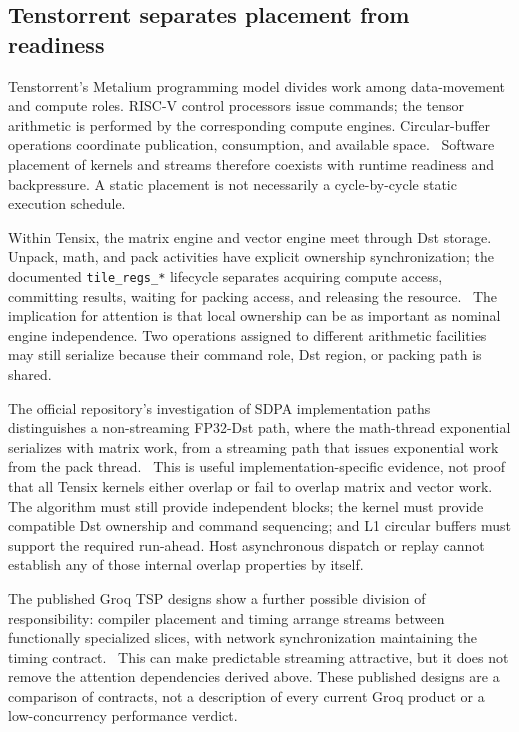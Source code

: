 \subsection{Tenstorrent separates placement from readiness}

Tenstorrent's Metalium programming model divides work among data-movement and compute roles. RISC-V control processors issue commands; the tensor arithmetic is performed by the corresponding compute engines. Circular-buffer operations coordinate publication, consumption, and available space.~\citep{u001-metalium} Software placement of kernels and streams therefore coexists with runtime readiness and backpressure. A static placement is not necessarily a cycle-by-cycle static execution schedule.

Within Tensix, the matrix engine and vector engine meet through Dst storage. Unpack, math, and pack activities have explicit ownership synchronization; the documented \texttt{tile\_regs\_*} lifecycle separates acquiring compute access, committing results, waiting for packing access, and releasing the resource.~\citep{u001-tensix} The implication for attention is that local ownership can be as important as nominal engine independence. Two operations assigned to different arithmetic facilities may still serialize because their command role, Dst region, or packing path is shared.

The official repository's investigation of SDPA implementation paths distinguishes a non-streaming FP32-Dst path, where the math-thread exponential serializes with matrix work, from a streaming path that issues exponential work from the pack thread.~\citep{u001-tt-sdpa-investigation} This is useful implementation-specific evidence, not proof that all Tensix kernels either overlap or fail to overlap matrix and vector work. The algorithm must still provide independent blocks; the kernel must provide compatible Dst ownership and command sequencing; and L1 circular buffers must support the required run-ahead. Host asynchronous dispatch or replay cannot establish any of those internal overlap properties by itself.

The published Groq TSP designs show a further possible division of responsibility: compiler placement and timing arrange streams between functionally specialized slices, with network synchronization maintaining the timing contract.~\citep{u001-groq2020,u001-groq2022} This can make predictable streaming attractive, but it does not remove the attention dependencies derived above. These published designs are a comparison of contracts, not a description of every current Groq product or a low-concurrency performance verdict.

